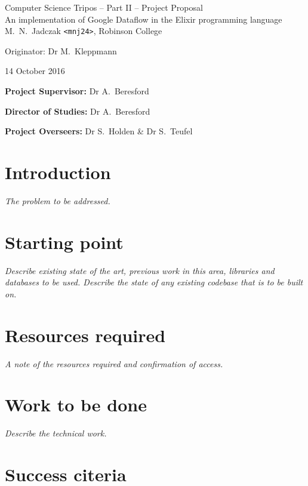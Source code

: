 \documentclass[11pt]{scrartcl}
\begin{document}
\begin{center}
\Large
Computer Science Tripos -- Part II -- Project Proposal\\[4mm]
\LARGE
An implementation of Google Dataflow in the Elixir programming language\\[4mm]

\large
M.~N.~Jadczak \texttt{<mnj24>}, Robinson College

Originator: Dr M.~Kleppmann

14 October 2016
\end{center}

\vspace{5mm}

\textbf{Project Supervisor:} Dr A.~Beresford

\textbf{Director of Studies:} Dr A.~Beresford

\textbf{Project Overseers:} Dr S.~Holden  \& Dr S.~Teufel


\section*{Introduction}

\emph{The problem to be addressed.}

\section*{Starting point}

\emph{Describe existing state of the art, previous work in this area,
  libraries and databases to be used. Describe the state of any
  existing codebase that is to be built on.}

\section*{Resources required}

\emph{A note of the resources required and confirmation of access.}

\section*{Work to be done}

\emph{Describe the technical work.}

\section*{Success citeria}
\end{document}
